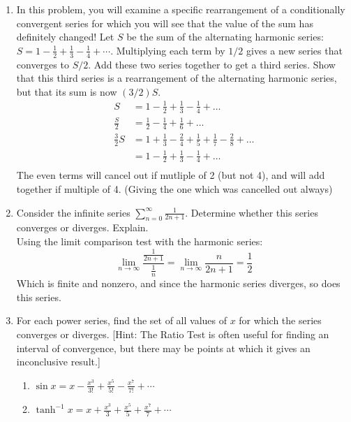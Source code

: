 \documentclass[hidelinks,12pt]{article}
\begin{document}
\begin{enumerate}
\begin{proof}[Proof]
    Observe that $s_{2k}$ (even partial sums) are monotone increasing. (Also, since these partial sums are never infinite, we never run into the grouping terms problem which was shown in class). And similarly, $s_{2k+1}$ are monotone decreasing.\\
    Now setting up our intervals, we have 
    \[[0,s_1]\supset[s_2,s_3]\supset[s_4,s_5]\supset\dots\supset[s_{2k},s_{2k+1}]\]
    Which are nested, closed, and bounded, and we were given that\\ $\lim_{n\to\infty}b_n=0$. Therefore we have $\bigcap[s_{2k},s_{2k+1}]\ni x$ for some $x$. Therefore $\sum a_n$ converges.
\end{proof}
\item In this problem, you will examine a specific rearrangement of a conditionally convergent series for which you will see that the value of the sum has definitely changed!
Let $S$ be the sum of the alternating harmonic series: $S=1-\frac{1}{2}+\frac{1}{3}-\frac{1}{4}+\cdots$. Multiplying each term by $1 / 2$ gives a new series that converges to $S / 2$. Add these two series together to get a third series. Show that this third series is a rearrangement of the alternating harmonic series, but that its sum is now $(3 / 2) S$.
\begin{align*}    
    S&=1-\frac{1}{2}+\frac{1}{3}-\frac{1}{4}+\dots\\
    \frac{S}{2}&=\frac{1}{2}-\frac{1}{4}+\frac{1}{6}+\dots\\
    \frac{3}{2}S&=1+\frac{1}{3}-\frac{2}{4}+\frac{1}{5}+\frac{1}{7}-\frac{2}{8}+\dots\\
                &=1-\frac{1}{2}+\frac{1}{3}-\frac{1}{4}+\dots\\
\end{align*}
The even terms will cancel out if mutliple of 2 (but not 4), and will add together if multiple of 4. (Giving the one which was cancelled out always)
\item Consider the infinite series $\sum_{n=0}^{\infty} \frac{1}{2 n+1}$. Determine whether this series converges or diverges. Explain.\\
    Using the limit comparison test with the harmonic series:
    \[\lim_{n\to\infty}\frac{\frac{1}{2n+1}}{\frac{1}{n}}=\lim_{n\to\infty}\frac{n}{2n+1}=\frac{1}{2}\] Which is finite and nonzero, and since the harmonic series diverges, so does this series.
\item For each power series, find the set of all values of $x$ for which the series converges or diverges. [Hint: The Ratio Test is often useful for finding an interval of convergence, but there may be points at which it gives an inconclusive result.]
    \begin{enumerate}
\item $\sin x=x-\frac{x^3}{3 !}+\frac{x^5}{5 !}-\frac{x^7}{7 !}+\cdots$
\item $\tanh ^{-1} x=x+\frac{x^3}{3}+\frac{x^5}{5}+\frac{x^7}{7}+\cdots$
    \end{enumerate}
    \end{enumerate}
\end{document}
